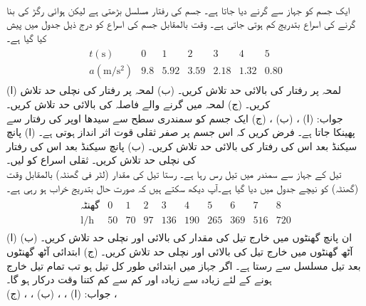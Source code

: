 \\
ایک جسم کو جہاز سے گرنے دیا جاتا ہے۔ جسم کی رفتار مسلسل بڑھتی ہے لیکن ہوائی رگڑ کی بنا گرنے کی اسراع بتدریج کم ہوتی جاتی ہے۔ وقت بالمقابل جسم کی اسراع کو درج ذیل جدول میں پیش کیا گیا ہے۔
\begin{align*}
\begin{array}{c|cccccc}
t(\si{\second})&0&1&2&3&4&5\\
\hline
a(\si{\meter\per\second\squared})&9.8&5.92&3.59&2.18&1.32&0.80
\end{array}
\end{align*} 
(ا) لمحہ  پر رفتار کی بالائی حد تلاش کریں۔ (ب) لمحہ  پر رفتار کی نچلی حد تلاش کریں۔ (ج) لمحہ  میں گرنے والے فاصلہ کی بالائی حد تلاش کریں۔\\ 
جواب:\quad
(ا) ، (ب) ، (ج) 
ایک جسم کو سمندری سطح سے سیدھا اوپر  کی رفتار سے  پھینکا جاتا ہے۔ فرض کریں کہ اس جسم پر صفر ثقلی قوت اثر انداز ہوتی ہے۔ (ا) پانچ سیکنڈ بعد اس کی رفتار کی بالائی حد تلاش کریں۔ (ب) پانچ سیکنڈ بعد اس کی رفتار کی نچلی حد تلاش کریں۔ ثقلی اسراع کو  لیں۔
\\
تیل کے جہاز سے سمندر میں تیل رس رہا ہے۔ رستا تیل کی مقدار (لٹر فی گھنٹہ) بالمقابل وقت (گھنٹہ) کو نیچے جدول میں دیا گیا ہے۔آپ دیکھ سکتے ہیں کہ صورت حال بتدریج خراب ہو رہی ہے۔
\begin{align*}
\begin{array}{c|ccccccccc}
\text{گھنٹہ}&0&1&2&3&4&5&6&7&8\\
\hline
\si{\litre\per\hour}&50&70&97&136&190&265&369&516&720
\end{array}
\end{align*} 
(ا) ان پانچ گھنٹوں میں خارج تیل کی مقدار کی بالائی اور نچلی حد تلاش کریں۔ (ب) آٹھ گھنٹوں میں خارج تیل کی بالائی اور نچلی حد تلاش  کریں۔ (ج) ابتدائی آٹھ گھنٹوں بعد تیل مسلسل  سے رستا ہے۔ اگر جہاز میں ابتدائی طور کل  تیل ہو تب تمام تیل خارج ہونے کے لئے زیادہ سے زیادہ اور کم سے کم  کتنا وقت درکار ہو گا۔ \\
جواب:\quad
(ا) ، ، (ب) ، ، (ج) ، 

